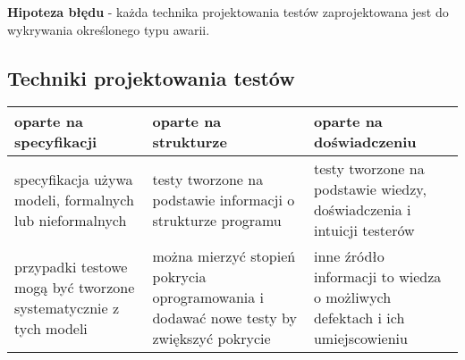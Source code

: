 \documentclass[../main.tex]{subfiles}
\begin{document}
    \textbf{Hipoteza błędu} - każda technika projektowania testów zaprojektowana jest do
    wykrywania określonego typu awarii.

    \subsection{Techniki projektowania testów}

    \begin{table}[H]
        \begin{center}
            \begin{tabular}{ p{5cm} p{5cm} p{5cm} }
                \toprule
                \textbf{oparte na specyfikacji} & \textbf{oparte na strukturze} & \textbf{oparte na doświadczeniu}\\
                \toprule
                specyfikacja używa
                modeli, formalnych
                lub nieformalnych
                &
                testy tworzone na
                podstawie informacji
                o strukturze programu
                &
                testy tworzone na
                podstawie wiedzy,
                doświadczenia i
                intuicji testerów\\

                przypadki testowe
                mogą być tworzone
                systematycznie z
                tych modeli
                &
                można mierzyć
                stopień pokrycia
                oprogramowania i
                dodawać nowe testy
                by zwiększyć pokrycie
                &
                inne źródło informacji
                to wiedza o
                możliwych defektach i
                ich umiejscowieniu\\


\end{tabular}
\end{center}
\end{table}
\end{document}
